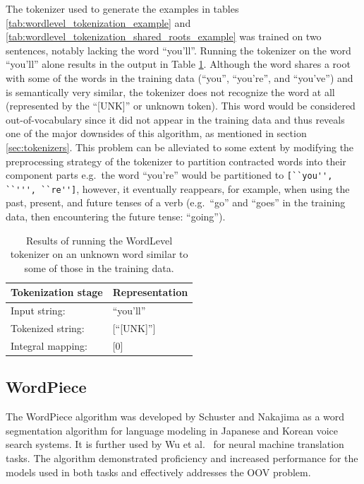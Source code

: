 \documentclass[12pt]{article}
\begin{document}
The tokenizer used to generate the examples in tables \ref{tab:wordlevel_tokenization_example} and
\ref{tab:wordlevel_tokenization_shared_roots_example} was trained on two sentences, notably lacking the word ``you'll''. Running the tokenizer on the
word ``you'll'' alone results in the output in Table \ref{tab:wordlevel_unk_word}. Although the word shares a root with some of the words in the
training data (``you'', ``you're'', and ``you've'') and is semantically very similar, the tokenizer does not recognize the word at all (represented
by the ``[UNK]'' or unknown token). This word would be considered out-of-vocabulary since it did not appear in the training data and thus reveals one
of the major downsides of this algorithm, as mentioned in section \ref{sec:tokenizers}. This problem can be alleviated to some extent by modifying the
preprocessing strategy of the tokenizer to partition contracted words into their component parts e.g.~the word ``you're'' would be partitioned to
\lstinline|[``you'', ``''', ``re'']|, however, it eventually reappears, for example, when using the past, present, and future tenses of a verb
(e.g.~``go'' and ``goes'' in the training data, then encountering the future tense: ``going'').

\begin{table}[!t]
    \centering
    \begin{tabular}{l l}
        \toprule
        Tokenization stage & Representation \\
        \midrule
        Input string:      & ``you'll''     \\
        Tokenized string:  & [``[UNK]'']    \\
        Integral mapping:  & [0]            \\
        \bottomrule
    \end{tabular}
    \caption{Results of running the WordLevel tokenizer on an unknown word similar to some of those in the training data.}
    \label{tab:wordlevel_unk_word}
\end{table}

\subsection{WordPiece}\label{sec:wordpiece}
The WordPiece algorithm was developed by Schuster and Nakajima \cite{schuster_japanese_2012} as a word segmentation algorithm for language modeling in
Japanese and Korean voice search systems. It is further used by Wu et al.~\cite{wu_googles_2016} for neural machine translation tasks. The algorithm
demonstrated proficiency and increased performance for the models used in both tasks and effectively addresses the OOV problem.
\end{document}
